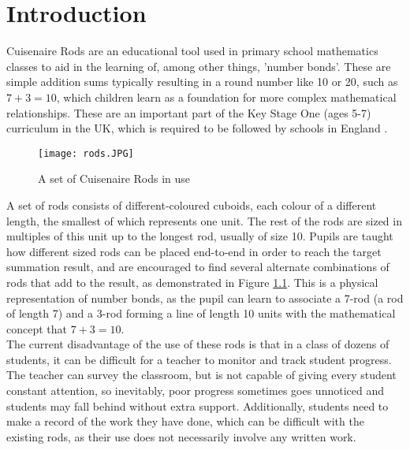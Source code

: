 \chapter{Introduction}
\label{sec:intro}

Cuisenaire\textsuperscript{\textregistered} Rods \cite{TheCuise14:online} are an educational tool used in primary school mathematics classes to aid in the learning of, among other things, 'number bonds'. These are simple addition sums typically resulting in a round number like 10 or 20, such as $7+3=10$, which children learn as a foundation for more complex mathematical relationships. These are an important part of the Key Stage One (ages 5-7) curriculum in the UK, which is required to be followed by schools in England \cite{Mathemat26:online}. 

\begin{figure}[h] 
  \texttt{[image: rods.JPG]}
  \centering
  \caption{A set of Cuisenaire\textsuperscript{\textregistered} Rods in use \cite{24Lesnom77:online}}
  \label{fig:rods}
\end{figure}

A set of rods consists of different-coloured cuboids, each colour of a different length, the smallest of which represents one unit. The rest of the rods are sized in multiples of this unit up to the longest rod, usually of size 10. Pupils are taught how different sized rods can be placed end-to-end in order to reach the target summation result, and are encouraged to find several alternate combinations of rods that add to the result, as demonstrated in Figure \ref{fig:rods}. This is a physical representation of number bonds, as the pupil can learn to associate a 7-rod (a rod of length 7) and a 3-rod forming a line of length 10 units with the mathematical concept that $7+3=10$. \\

The current disadvantage of the use of these rods is that in a class of dozens of students, it can be difficult for a teacher to monitor and track student progress. The teacher can survey the classroom, but is not capable of giving every student constant attention, so inevitably, poor progress sometimes goes unnoticed and students may fall behind without extra support. Additionally, students need to make a record of the work they have done, which can be difficult with the existing rods, as their use does not necessarily involve any written work.